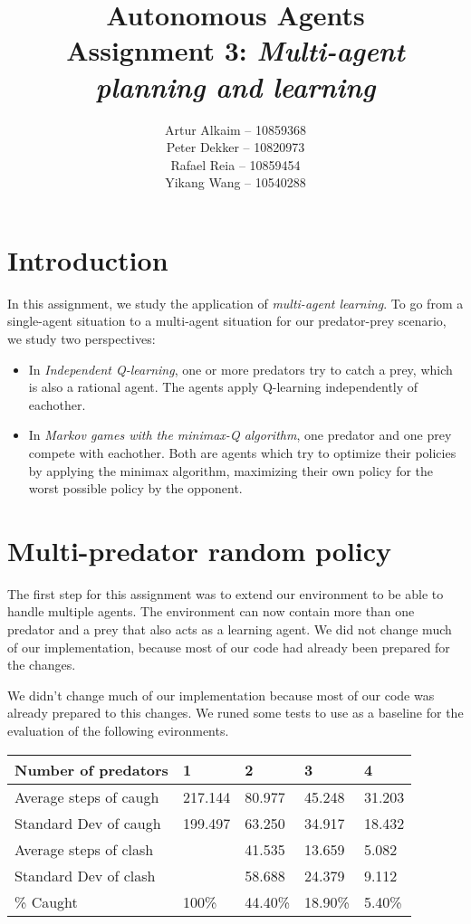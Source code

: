 \documentclass{article}
\begin{document}
\title{Autonomous Agents\\
Assignment 3: \emph{Multi-agent planning and learning}}
\author{
Artur Alkaim -- 10859368\\
Peter Dekker -- 10820973\\
Rafael Reia -- 10859454\\
Yikang Wang -- 10540288\\
}
\maketitle
\section{Introduction}
In this assignment, we study the application of \emph{multi-agent learning}. To go from a single-agent situation to a multi-agent situation for our predator-prey scenario, we study two perspectives:

\begin{itemize}
 \item In \emph{Independent Q-learning}, one or more predators try to catch a prey, which is also a rational agent. The agents apply Q-learning independently of eachother.
 \item In \emph{Markov games with the minimax-Q algorithm}, one predator and one prey compete with eachother. Both are agents which try to optimize their policies by applying the minimax algorithm, maximizing their own policy for the worst possible policy by the opponent.
\end{itemize}
\section{Multi-predator random policy}
The first step for this assignment was to extend our environment to be able to
handle multiple agents. The environment can now contain more than one predator and a prey that also acts as a learning agent.
We did not change much of our implementation, because most of our code had
already been prepared for the changes.

We didn't change much of our implementation because most of our code was
already prepared to this changes. We runed some tests to use as a baseline for
the evaluation of the following evironments.

\begin{table}[h]
\centering
\begin{tabular}{|l|l|l|l|l|}
\hline
Number of predators    & 1       & 2       & 3       & 4      \\ \hline
Average steps of caugh & 217.144 & 80.977  & 45.248  & 31.203 \\ \hline
Standard Dev of caugh  & 199.497 & 63.250  & 34.917  & 18.432 \\ \hline
Average steps of clash &         & 41.535  & 13.659  & 5.082  \\ \hline
Standard Dev of clash  &         & 58.688  & 24.379  & 9.112  \\ \hline
\% Caught              & 100\%   & 44.40\% & 18.90\% & 5.40\% \\ \hline
\end{tabular}
\end{table}
\end{document}
